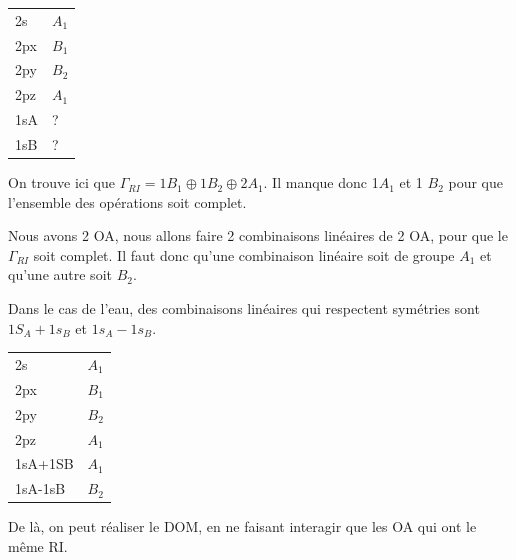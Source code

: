 \documentclass[french]{yLectureNote}
\begin{document}
\begin{center}
\begin{tabular}{ll}
2s &\(A_1\)\\
2px &\(B_1\)\\
2py & \(B_2\)\\
2pz & \(A_1\)\\
1sA & ?\\
1sB & ?\\
\end{tabular}
\end{center}

On trouve ici que \(\Gamma_{RI} = 1B_1\oplus 1B_2\oplus 2A_1\). Il manque donc 1\(A_1\) et 1 \(B_2\) pour que l'ensemble des opérations soit complet.

Nous avons 2 OA, nous allons faire 2 combinaisons linéaires de 2 OA, pour que le \(\Gamma_{RI}\) soit complet. Il faut donc qu'une combinaison linéaire soit de groupe \(A_1\) et qu'une autre soit \(B_2\).

Dans le cas de l'eau, des combinaisons linéaires qui respectent symétries sont \(1S_A+1s_B\) et \(1s_A-1s_B\).

\begin{center}
\begin{tabular}{ll}
2s &\(A_1\)\\
2px &\(B_1\)\\
2py & \(B_2\)\\
2pz & \(A_1\)\\
1sA+1SB & \(A_1\)\\
1sA-1sB & \(B_2\)\\
\end{tabular}
\end{center}


De là, on peut réaliser le DOM, en ne faisant interagir que les OA qui ont le m\^eme RI.
 
\end{document}
